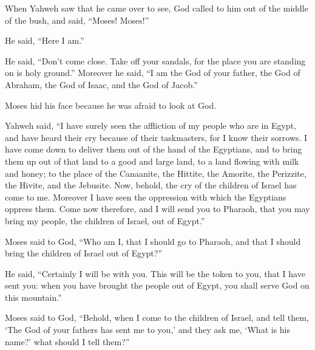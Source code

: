  When Yahweh saw that he came over to see, God called to
him out of the middle of the bush, and said, ``Moses! Moses!''

He said, ``Here I am.''

 He said, ``Don't come close. Take off your sandals, for
the place you are standing on is holy ground.''  Moreover
he said, ``I am the God of your father, the God of Abraham, the God of
Isaac, and the God of Jacob.''

Moses hid his face because he was afraid to look at God.

 Yahweh said, ``I have surely seen the affliction of my
people who are in Egypt, and have heard their cry because of their
taskmasters, for I know their sorrows.  I have come down
to deliver them out of the hand of the Egyptians, and to bring them up
out of that land to a good and large land, to a land flowing with milk
and honey; to the place of the Canaanite, the Hittite, the Amorite, the
Perizzite, the Hivite, and the Jebusite.  Now, behold, the
cry of the children of Israel has come to me. Moreover I have seen the
oppression with which the Egyptians oppress them.  Come
now therefore, and I will send you to Pharaoh, that you may bring my
people, the children of Israel, out of Egypt.''

 Moses said to God, ``Who am I, that I should go to
Pharaoh, and that I should bring the children of Israel out of Egypt?''

 He said, ``Certainly I will be with you. This will be
the token to you, that I have sent you: when you have brought the people
out of Egypt, you shall serve God on this mountain.''

 Moses said to God, ``Behold, when I come to the children
of Israel, and tell them, `The God of your fathers has sent me to you,'
and they ask me, `What is his name?' what should I tell them?''

